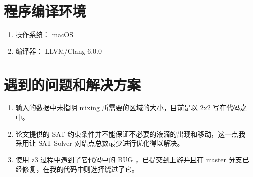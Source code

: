 \documentclass[11pt]{article}
\begin{document}
\section{程序编译环境}
\label{sec:orgc29ee50}
\begin{enumerate}
\item 操作系统： macOS
\item 编译器： LLVM/Clang 6.0.0
\end{enumerate}

\section{遇到的问题和解决方案}
\label{sec:org895ad27}
\begin{enumerate}
\item 输入的数据中未指明 mixing 所需要的区域的大小，目前是以 2x2 写在代码之中。
\item 论文提供的 SAT 约束条件并不能保证不必要的液滴的出现和移动，这一点我采用让 SAT Solver 对结点总数最少进行优化得以解决。
\item 使用 z3 过程中遇到了它代码中的 BUG ，已提交到上游并且在 master 分支已经修复，在我的代码中则选择绕过了它。
\end{enumerate}
\end{document}
